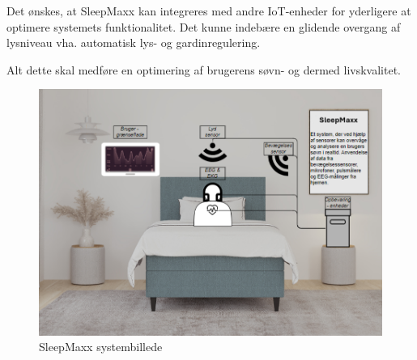 \documentclass{article}
\begin{document}
Det ønskes, at SleepMaxx kan integreres med andre IoT-enheder for yderligere at optimere systemets funktionalitet. Det kunne indebære en glidende overgang af lysniveau vha. automatisk lys- og gardinregulering. 

Alt dette skal medføre en optimering af brugerens søvn- og dermed livskvalitet.

\begin{figure}[h!]
    \centering
    \includegraphics[width=1\textwidth]{SleepMaxx_image.png}
    \caption{SleepMaxx systembillede}
    \label{fig:sleepmaxx}
\end{figure}
\end{document}
